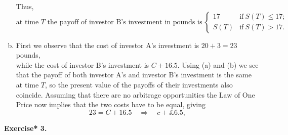 \documentclass[11pt,a4paper]{article}
\begin{document}
\begin{enumerate}[(a)]
\begin{enumerate}[(i)]
        \end{enumerate}
        Thus,
        $$
        \text{at time $T$ the payoff of investor B’s investment in pounds is}\ 
        \begin{cases}
            17 & \text{if}\ S(T) \leq 17;\\
            S(T) & \text{if}\ S(T)>17.
        \end{cases}
        $$
        \item First we observe that the cost of investor A’s investment is $20 + 3 = 23$ pounds,\\
        while the cost of investor B’s investment is $C + 16.5$. Using (a) and (b) we see that the payoff of both investor A’s and investor B’s investment is the same at time $T$, so the present value of the payoffs of their investments also coincide. Assuming that there are no arbitrage opportunities the Law of One Price now implies that the two costs have to be equal, giving
        $$
        23 = C+16.5 \quad \Rightarrow \quad c+\pounds 6.5,
        $$
    \end{enumerate}
    \textbf{Exercise* 3.}
\end{document}
